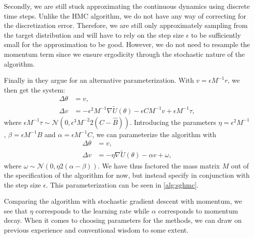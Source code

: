 Secondly, we are still stuck approximating the continuous dynamics using discrete time steps.
Unlike the HMC algorithm, we do not have any way of correcting for the discretization error. 
Therefore, we are still only approximately sampling from the target distribution and will have to rely on the step size $\epsilon$ to be sufficiently small for the approximation to be good.
However, we do not need to resample the momentum term since we ensure ergodicity through the stochastic nature of the algorithm.

Finally in \autocite{chen_stochastic_2014} they argue for an alternative parameterization.
With $v = \epsilon M^{-1} r$, we then get the system:
\begin{align}
    \Delta \theta &=  v, \\
    \Delta v &=  -\epsilon^2 M^{-1} \nabla\tilde{U}(\theta) - \epsilon CM^{-1}v  + \epsilon M^{-1}\tau,
\end{align}
where $\epsilon M^{-1}\tau\sim \mathcal{N}(0, \epsilon^3M^{-2}2(C - \hat{B}))$.
Introducing the parameters $\eta = \epsilon^2M^{-1}$, $\beta = \epsilon M^{-1} B$ and $\alpha = \epsilon M^{-1}C$, we can parameterize the algorithm with
\begin{align}
    \Delta \theta &=  v, \\
    \Delta v &=  -\eta \nabla\tilde{U}(\theta) - \alpha v  + \omega,
\end{align}
where $\omega \sim \mathcal{N}(0, \eta 2(\alpha - \beta))$.
We have thus factored the mass matrix $M$ out of the specification of the algorithm for now, but instead specify in conjunction with the step size $\epsilon$. 
This parameterization can be seen in \cref{alg:sghmc}.

Comparing the algorithm with stochastic gradient descent with momentum, we see that  $\eta$ corresponds to the learning rate while $\alpha$ corresponds to momentum decay. 
When it comes to choosing parameters for the methods, we can draw on previous experience and conventional wisdom to some extent.


